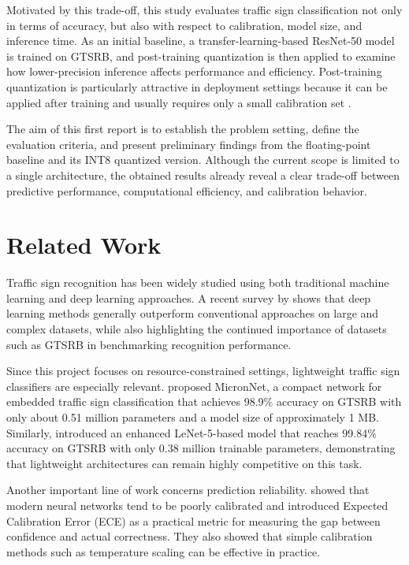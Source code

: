 \documentclass{article} %
\begin{document}
Motivated by this trade-off, this study evaluates traffic sign classification not only in terms of accuracy, but also with respect to calibration, model size, and inference time. As an initial baseline, a transfer-learning-based ResNet-50 model is trained on GTSRB, and post-training quantization is then applied to examine how lower-precision inference affects performance and efficiency. Post-training quantization is particularly attractive in deployment settings because it can be applied after training and usually requires only a small calibration set \citep{hubara2021ptq}.

The aim of this first report is to establish the problem setting, define the evaluation criteria, and present preliminary findings from the floating-point baseline and its INT8 quantized version. Although the current scope is limited to a single architecture, the obtained results already reveal a clear trade-off between predictive performance, computational efficiency, and calibration behavior.

\section{Related Work}

Traffic sign recognition has been widely studied using both traditional machine learning and deep learning approaches. A recent survey by \citet{lim2023review} shows that deep learning methods generally outperform conventional approaches on large and complex datasets, while also highlighting the continued importance of datasets such as GTSRB in benchmarking recognition performance.

Since this project focuses on resource-constrained settings, lightweight traffic sign classifiers are especially relevant. \citet{wong2018micronnet} proposed MicronNet, a compact network for embedded traffic sign classification that achieves 98.9\% accuracy on GTSRB with only about 0.51 million parameters and a model size of approximately 1 MB. Similarly, \citet{zaibi2021lenet} introduced an enhanced LeNet-5-based model that reaches 99.84\% accuracy on GTSRB with only 0.38 million trainable parameters, demonstrating that lightweight architectures can remain highly competitive on this task.

Another important line of work concerns prediction reliability. \citet{guo2017calibration} showed that modern neural networks tend to be poorly calibrated and introduced Expected Calibration Error (ECE) as a practical metric for measuring the gap between confidence and actual correctness. They also showed that simple calibration methods such as temperature scaling can be effective in practice.
\end{document}
